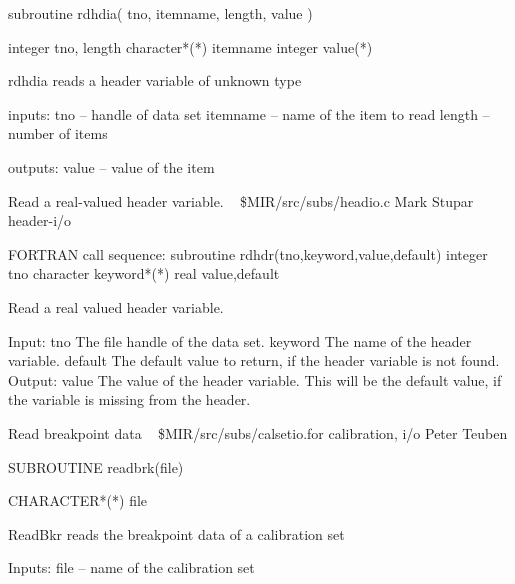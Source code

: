 \par{\tenpoint
{\eightpoint\begintt
        subroutine rdhdia( tno, itemname, length, value )

        integer tno, length
        character*(*) itemname
        integer value(*)

   rdhdia reads a header variable of unknown type

   inputs:
       tno               -- handle of data set
       itemname          -- name of the item to read
       length            -- number of items

   outputs:
       value             -- value of the item
\endtt}
\par}
%
\noindent Read a real-valued header variable.
\newline \ 
\newline {} \$MIR/src/subs/headio.c
\newline {} Mark Stupar
\newline {} header-i/o
\par{\tenpoint
{\eightpoint\begintt
FORTRAN call sequence:
        subroutine rdhdr(tno,keyword,value,default)
        integer tno
        character keyword*(*)
        real value,default

  Read a real valued header variable.

  Input:
    tno         The file handle of the data set.
    keyword     The name of the header variable.
    default     The default value to return, if the header variable
                is not found.
  Output:
    value       The value of the header variable. This will be the default
                value, if the variable is missing from the header.      
\endtt}
\par}
%
\noindent Read breakpoint data
\newline \ 
\newline {} \$MIR/src/subs/calsetio.for
\newline {} calibration, i/o
\newline \abox{Responsible:} Peter Teuben
\par{\tenpoint
{\eightpoint\begintt
        SUBROUTINE readbrk(file)

        CHARACTER*(*) file

       ReadBkr reads the breakpoint data of a calibration set

   Inputs:
       file -- name of the calibration set
\endtt}
\par}
